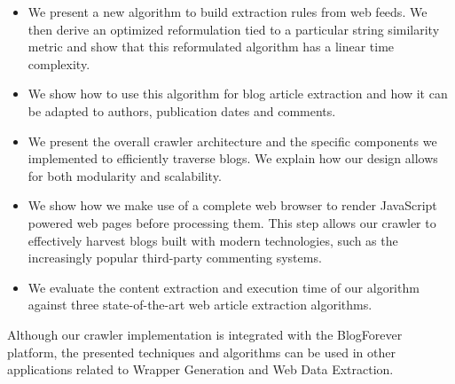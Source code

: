 \begin{itemize}
  \item We present a new algorithm to build extraction rules from web feeds. We then derive an optimized reformulation tied to a particular string similarity metric and show that this reformulated algorithm has a linear time complexity.
  \item We show how to use this algorithm for blog article extraction and how it can be adapted to authors, publication dates and comments.
  \item We present the overall crawler architecture and the specific components we implemented to efficiently traverse blogs. We explain how our design allows for both modularity and scalability.
  \item We show how we make use of a complete web browser to render JavaScript powered web pages before processing them. This step allows our crawler to effectively harvest blogs built with modern technologies, such as the increasingly popular third-party commenting systems.
  \item We evaluate the content extraction and execution time of our algorithm against three state-of-the-art web article extraction algorithms.
\end{itemize}
  
Although our crawler implementation is integrated with the BlogForever platform, the presented techniques and algorithms can be used in other applications related to Wrapper Generation and Web Data Extraction.
